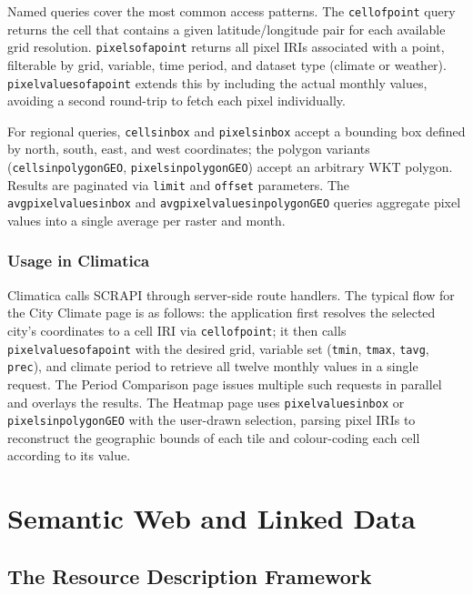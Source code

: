 Named queries cover the most common access patterns. The \texttt{cellofpoint}
query returns the cell that contains a given latitude/longitude pair for each
available grid resolution. \texttt{pixelsofapoint} returns all pixel IRIs
associated with a point, filterable by grid, variable, time period, and dataset
type (climate or weather). \texttt{pixelvaluesofapoint} extends this by
including the actual monthly values, avoiding a second round-trip to fetch each
pixel individually.

For regional queries, \texttt{cellsinbox} and \texttt{pixelsinbox} accept a
bounding box defined by north, south, east, and west coordinates; the polygon
variants (\texttt{cellsinpolygonGEO}, \texttt{pixelsinpolygonGEO}) accept an
arbitrary WKT polygon. Results are paginated via \texttt{limit} and
\texttt{offset} parameters. The \texttt{avgpixelvaluesinbox} and 
\texttt{avgpixelvaluesinpolygonGEO} queries aggregate pixel values into a 
single average per raster and month.

\subsubsection{Usage in Climatica}\label{REL_WORLDCLIM_API_USAGE}

Climatica calls SCRAPI through server-side route handlers. The typical flow for
the City Climate page is as follows: the application first resolves the selected
city's coordinates to a cell IRI via \texttt{cellofpoint}; it then calls
\texttt{pixelvaluesofapoint} with the desired grid, variable set
(\texttt{tmin}, \texttt{tmax}, \texttt{tavg}, \texttt{prec}), and climate period
to retrieve all twelve monthly values in a single request. The Period Comparison
page issues multiple such requests in parallel and overlays the results. The
Heatmap page uses \texttt{pixelvaluesinbox} or \texttt{pixelsinpolygonGEO} with
the user-drawn selection, parsing pixel IRIs to reconstruct the
geographic bounds
of each tile and colour-coding each cell according to its value.


\section{Semantic Web and Linked Data}\label{REL_SEMWEB}

\subsection{The Resource Description Framework}\label{REL_SEMWEB_RDF}

